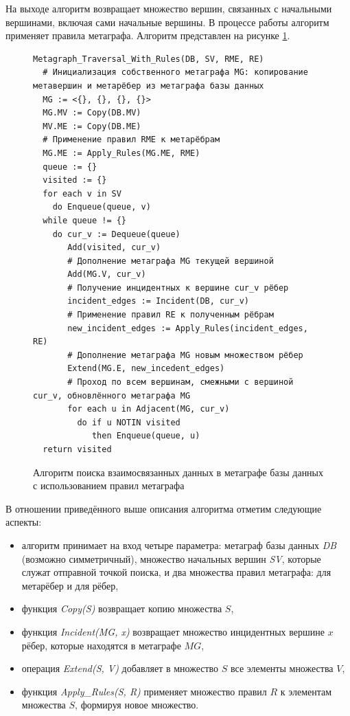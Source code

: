 На выходе алгоритм возвращает множество вершин, связанных с начальными вершинами, включая сами начальные вершины. В процессе работы алгоритм применяет правила метаграфа. Алгоритм представлен на рисунке \ref{algorithm-with-rules}.

\begin{figure}
  \begin{lstlisting}
Metagraph_Traversal_With_Rules(DB, SV, RME, RE)
  # Инициализация собственного метаграфа MG: копирование метавершин и метарёбер из метаграфа базы данных
  MG := <{}, {}, {}, {}>
  MG.MV := Copy(DB.MV)
  MV.ME := Copy(DB.ME)
  # Применение правил RME к метарёбрам
  MG.ME := Apply_Rules(MG.ME, RME)
  queue := {}
  visited := {}
  for each v in SV
    do Enqueue(queue, v)
  while queue != {}
    do cur_v := Dequeue(queue)
       Add(visited, cur_v)
       # Дополнение метаграфа MG текущей вершиной
       Add(MG.V, cur_v)
       # Получение инцидентных к вершине cur_v рёбер
       incident_edges := Incident(DB, cur_v)
       # Применение правил RE к полученным рёбрам
       new_incident_edges := Apply_Rules(incident_edges, RE)
       # Дополнение метаграфа MG новым множеством рёбер
       Extend(MG.E, new_incedent_edges)
       # Проход по всем вершинам, смежными с вершиной cur_v, обновлённого метаграфа MG
       for each u in Adjacent(MG, cur_v)
         do if u NOTIN visited
            then Enqueue(queue, u)
  return visited
  \end{lstlisting}
  \caption{Алгоритм поиска взаимосвязанных данных в метаграфе базы данных с использованием правил метаграфа}
  \label{algorithm-with-rules}
\end{figure}

В отношении приведённого выше описания алгоритма отметим следующие аспекты:
\begin{itemize}
  \item алгоритм принимает на вход четыре параметра: метаграф базы данных \textit{DB} (возможно симметричный), множество начальных вершин \textit{SV}, которые служат отправной точкой поиска, и два множества правил метаграфа: для метарёбер и для рёбер,
  \item функция \textit{Copy(S)} возвращает копию множества $S$,
  \item функция \textit{Incident(MG, x)} возвращает множество инцидентных вершине $x$ рёбер, которые находятся в метаграфе $MG$,
  \item операция \textit{Extend(S, V)} добавляет в множество $S$ все элементы множества $V$,
  \item функция \textit{Apply\_Rules(S, R)} применяет множество правил $R$ к элементам множества $S$, формируя новое множество.
\end{itemize}

